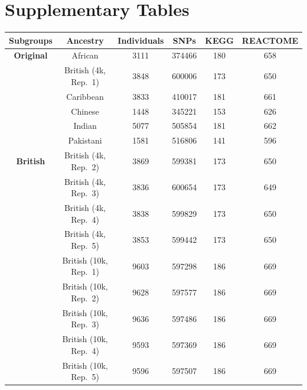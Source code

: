 \documentclass[10pt]{article}
\begin{document}

\clearpage
\newpage

\section{Supplementary Tables}\label{Supplementary-Tables}

\setlength{\extrarowheight}{3pt}

\begin{table}[ht]
\centering
\begin{tabular}{|c|c|c|c|c|c|}
  \hline
\textbf{Subgroups} & \textbf{Ancestry} & \textbf{Individuals} & \textbf{SNPs} & \textbf{KEGG} & \textbf{REACTOME} \\
[2pt]\hline
 \multirow{6.5}{*}{\textbf{Original}} &African & 3111 & 374466 & 180 & 658 \\ [2pt]
& British (4k, Rep.~1) & 3848 & 600006 & 173 & 650 \\ [2pt]
& Caribbean & 3833 & 410017 & 181 & 661 \\ [2pt]
& Chinese & 1448 & 345221 & 153 & 626 \\ [2pt]
& Indian & 5077 & 505854 & 181 & 662 \\ [2pt]
& Pakistani & 1581 & 516806 & 141 & 596 \\ [2pt]\hline
\multirow{9.5}{*}{\textbf{British}} & British (4k, Rep.~2) & 3869 & 599381 & 173 & 650 \\[2pt] 
& British (4k, Rep.~3) & 3836 & 600654 & 173 & 649 \\ [2pt]
& British (4k, Rep.~4) & 3838 & 599829 & 173 & 650 \\ [2pt]
& British (4k, Rep.~5) & 3853 & 599442 & 173 & 650 \\ [2pt]
& British (10k, Rep.~1) & 9603 & 597298 & 186 & 669 \\ [2pt]
& British (10k, Rep.~2) & 9628 & 597577 & 186 & 669 \\ [2pt]
& British (10k, Rep.~3) & 9636 & 597486 & 186 & 669 \\ [2pt]
& British (10k, Rep.~4) & 9593 & 597369 & 186 & 669 \\ [2pt]
& British (10k, Rep.~5) & 9596 & 597507 & 186 & 669 \\ [2pt]
  \hline
\end{tabular}

\end{table}
\end{document}
